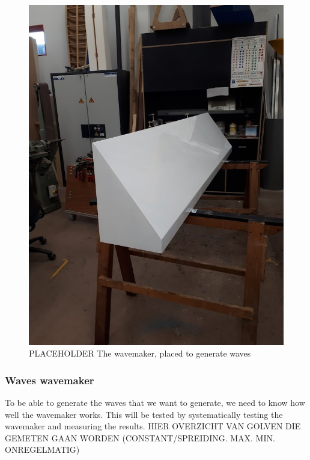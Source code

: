 \begin{figure}
	\centering
	\includegraphics[width=0.8\linewidth]{figs/Wedge_wavemaker_painted.jpg}
	\caption{PLACEHOLDER The wavemaker, placed to generate waves}
	\label{fig:exp_wavemaker}
\end{figure}

\subsubsection{Waves wavemaker}
\label{sec:results_wavemaker}
To be able to generate the waves that we want to generate, we need to know how well the wavemaker works. This will be tested by systematically testing the wavemaker and measuring the results.
HIER OVERZICHT VAN GOLVEN DIE GEMETEN GAAN WORDEN (CONSTANT/SPREIDING. MAX. MIN. ONREGELMATIG)

